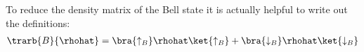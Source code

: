 To reduce the density matrix of the Bell state it is actually helpful to write out the definitions:
\begin{align}
\trarb{B}{\rhohat} = \bra{\uparrow_B}\rhohat\ket{\uparrow_B}+\bra{\downarrow_B}\rhohat\ket{\downarrow_B}\\

\end{align}